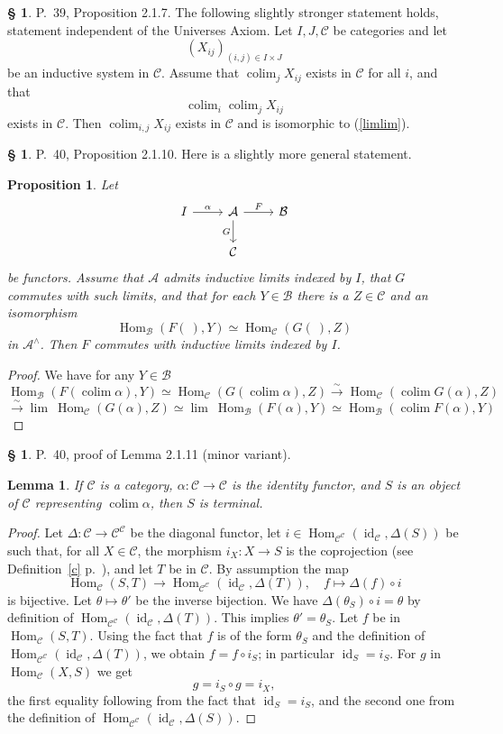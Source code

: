 \documentclass[12pt]{article}
\newtheorem{lem}[thm]{Lemma}
\newtheorem{prop}[thm]{Proposition}
\theoremstyle{remark}
\theoremstyle{definition}
\newtheorem{s}[thm]{\S}
\newcommand{\A}{\mathcal A}
\newcommand{\B}{\mathcal B}
\newcommand{\C}{\mathcal C}
\newcommand{\xr}{\xrightarrow}
\newcommand{\mv}{ (minor variant)}
\DeclareMathOperator*{\coli}{colim}
\DeclareMathOperator*{\co}{colim}
\DeclareMathOperator{\id}{id}
\DeclareMathOperator{\Hom}{Hom}%
\begin{document}
%
%
\begin{s} 
P.~39, Proposition 2.1.7. The following slightly stronger statement holds, statement independent of the Universes Axiom. Let $I, J, \C$ be categories and let 
$$
(X_{ij})_{(i,j)\in I\times J}
$$ 
be an inductive system in $\C$. Assume that $\coli_jX_{ij}$ exists in $\C$ for all $i$, and that 
\begin{equation}\label{limlim}
\coli_i\coli_jX_{ij}
\end{equation}
exists in $\C$. Then $\coli_{i,j}X_{ij}$ exists in $\C$ and is isomorphic to (\ref{limlim}).
\end{s}
%
%
\begin{s} 
P.~40, Proposition 2.1.10. Here is a slightly more general statement. 
%
\begin{prop}\label{2.1.10}
Let 
$$
\begin{tikzcd}
I\ar{r}{\alpha}&\A\ar{d}[swap]{G}\ar{r}{F}&\B\\
&\C
\end{tikzcd}
$$
be functors. Assume that $\A$ admits inductive limits indexed by $I$, that $G$ commutes with such limits, and that for each $Y\in\B$ there is a $Z\in\C$ and an isomorphism 
$$
\Hom_\B(F(\ ),Y)\simeq\Hom_\C(G(\ ),Z)
$$
in $\A^\wedge$. Then $F$ commutes with inductive limits indexed by $I$.
\end{prop}
%
\begin{proof}
We have for any $Y\in\B$ 
$$ 
\Hom_\B\left(F\left(\coli\alpha\right),Y\right)\simeq
\Hom_\C\left(G\left(\coli\alpha\right),Z\right)
\xr\sim
\Hom_\C\left(\coli G(\alpha),Z\right)
$$
$$
\xr\sim\lim \ \Hom_\C(G(\alpha),Z)\simeq\lim \ \Hom_\B(F(\alpha),Y)\simeq\Hom_\B(\co F(\alpha),Y)
$$
\end{proof}
\end{s}
%
%
\begin{s} 
P.~40, proof of Lemma 2.1.11\mv.
%
\begin{lem} 
If $\C$ is a category, $\alpha:\C\to\C$ is the identity functor, and $S$ is an object of $\C$ representing $\coli\alpha$, then $S$ is terminal. 
\end{lem}
%
\begin{proof}
Let $\Delta:\C\to\C^\C$ be the diagonal functor, let $i\in\Hom_{\C^\C}(\id_\C,\Delta(S))$ be such that, for all $X\in\C$, the morphism $i_X:X\to S$ is the coprojection (see Definition~\ref{c} p.~\pageref{c}), and let $T$ be in $\C$. By assumption the map 
$$
\Hom_\C(S,T)\to\Hom_{\C^\C}(\id_\C,\Delta(T)),\quad f\mapsto\Delta(f)\circ i 
$$ 
is bijective. Let $\theta\mapsto\theta'$ be the inverse bijection. We have $\Delta(\theta_S)\circ i=\theta$ by definition of $\Hom_{\C^\C}(\id_\C,\Delta(T))$. This implies $\theta'=\theta_S$. Let $f$ be in $\Hom_\C(S,T)$. Using the fact that $f$ is of the form $\theta_S$ and the definition of $\Hom_{\C^\C}(\id_\C,\Delta(T))$, we obtain $f=f\circ i_S$; in particular $\id_S=i_S$. For $g$ in $\Hom_\C(X,S)$ we get 
$$
g=i_S\circ g=i_X,
$$
the first equality following from the fact that $\id_S=i_S$, and the second one from the definition of $\Hom_{\C^\C}(\id_\C,\Delta(S))$.
\end{proof}
\end{s}
\end{document}

